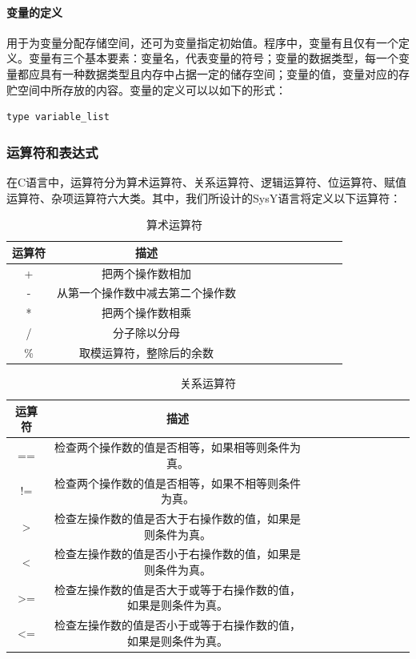 \documentclass[UTF8,a4paper,10pt]{ctexart}
\begin{document}
\paragraph{变量的定义} 用于为变量分配存储空间，还可为变量指定初始值。程序中，变量有且仅有一个定义。\cite{m}变量有三个基本要素：变量名，代表变量的符号；变量的数据类型，每一个变量都应具有一种数据类型且内存中占据一定的储存空间；变量的值，变量对应的存贮空间中所存放的内容。变量的定义可以以如下的形式：
\begin{lstlisting}[language = c++]
type variable_list
\end{lstlisting}
\subsubsection{运算符和表达式}
在C语言中，运算符分为算术运算符、关系运算符、逻辑运算符、位运算符、赋值运算符、杂项运算符六大类。其中，我们所设计的SysY语言将定义以下运算符：
\newpage
\begin{table}[!htbp]
  \centering
  \begin{tabular}{ccccccccccc}
  \toprule  
  运算符& 描述&\\
  \midrule
  +& 把两个操作数相加&\\
  -& 从第一个操作数中减去第二个操作数&\\  
  *& 把两个操作数相乘&\\
  /& 分子除以分母&\\
  \%& 取模运算符，整除后的余数&\\
  \bottomrule
  \end{tabular}
  \caption{算术运算符}
\end{table}
\begin{table}[!htbp]
  \centering
  \begin{tabular}{ccccccccccc}
  \toprule  
  运算符& 描述&\\
  \midrule
  ==&  检查两个操作数的值是否相等，如果相等则条件为真。& \\
  !=&   检查两个操作数的值是否相等，如果不相等则条件为真。& \\
  >&  检查左操作数的值是否大于右操作数的值，如果是则条件为真。& \\
  <&  检查左操作数的值是否小于右操作数的值，如果是则条件为真。&\\
  >=&   检查左操作数的值是否大于或等于右操作数的值，如果是则条件为真。& \\
  <=&   检查左操作数的值是否小于或等于右操作数的值，如果是则条件为真。& \\
  \bottomrule
  \end{tabular}
  \caption{关系运算符}
\end{table}
\end{document}
